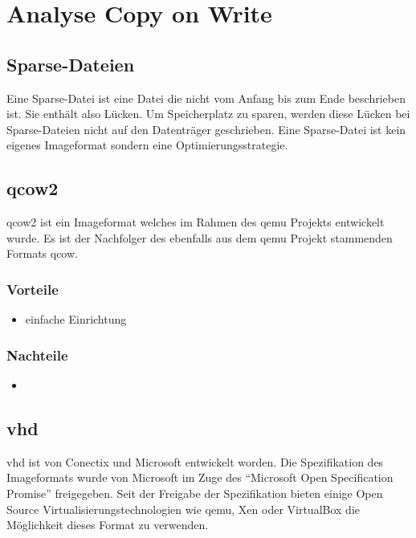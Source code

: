 \chapter{Analyse Copy on Write}
\section{Sparse-Dateien}
Eine Sparse-Datei ist eine Datei die nicht vom Anfang bis zum Ende beschrieben ist. Sie enthält also Lücken. Um Speicherplatz zu sparen, werden diese Lücken bei Sparse-Dateien nicht auf den Datenträger geschrieben. Eine Sparse-Datei ist kein eigenes Imageformat sondern eine Optimierungsstrategie. \cite{sparse}


\section{qcow2}
qcow2 ist ein Imageformat welches im Rahmen des qemu Projekts entwickelt wurde. Es ist der Nachfolger des ebenfalls aus dem qemu Projekt stammenden Formats qcow. \cite{qcowmarkmc} \cite{qemuwiki}

\subsection{Vorteile}
\begin{itemize}
 \item einfache Einrichtung
\end{itemize}

\subsection{Nachteile}
\begin{itemize}
 \item 
\end{itemize}

\section{vhd}
vhd ist von Conectix und Microsoft entwickelt worden. Die Spezifikation des Imageformats wurde von Microsoft im Zuge des ``Microsoft Open Specification Promise'' freigegeben. Seit der Freigabe der Spezifikation bieten einige Open Source Virtualisierungstechnologien wie qemu, Xen oder VirtualBox die Möglichkeit dieses Format zu verwenden. \cite{msosp} \cite{vhdspec} %

